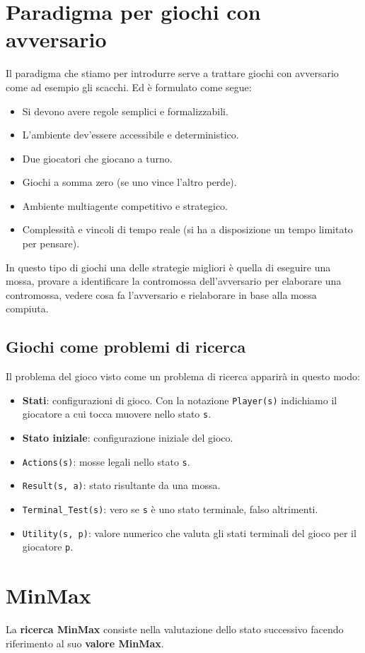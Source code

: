 \section{Paradigma per giochi con avversario}
Il paradigma che stiamo per introdurre serve a trattare giochi con avversario come ad esempio gli scacchi. Ed \`e formulato
come segue:
\begin{itemize}
	\item Si devono avere regole semplici e formalizzabili.
	\item L'ambiente dev'essere accessibile e deterministico.
	\item Due giocatori che giocano a turno.
	\item Giochi a somma zero (se uno vince l'altro perde).
	\item Ambiente multiagente competitivo e strategico.
	\item Complessit\`a e vincoli di tempo reale (si ha a disposizione un tempo limitato per pensare).
\end{itemize}
In questo tipo di giochi una delle strategie migliori \`e quella di eseguire una mossa, provare a identificare la
contromossa dell'avversario per elaborare una contromossa, vedere cosa fa l'avversario e rielaborare in base alla
mossa compiuta.

\subsection{Giochi come problemi di ricerca}
Il problema del gioco visto come un problema di ricerca apparir\`a in questo modo:
\begin{itemize}
	\item \textbf{Stati}: configurazioni di gioco. Con la notazione \verb|Player(s)| indichiamo il giocatore
	      a cui tocca muovere nello stato \verb|s|.
	\item \textbf{Stato iniziale}: configurazione iniziale del gioco.
	\item \verb|Actions(s)|: mosse legali nello stato \verb|s|.
	\item \verb|Result(s, a)|: stato risultante da una mossa.
	\item \verb|Terminal_Test(s)|: vero se \verb|s| \`e uno stato terminale, falso altrimenti.
	\item \verb|Utility(s, p)|: valore numerico che valuta gli stati terminali del gioco per il giocatore \verb|p|.
\end{itemize}

\section{MinMax}
La \textbf{ricerca MinMax} consiste nella valutazione dello stato successivo facendo riferimento al suo
\textbf{valore MinMax}.

